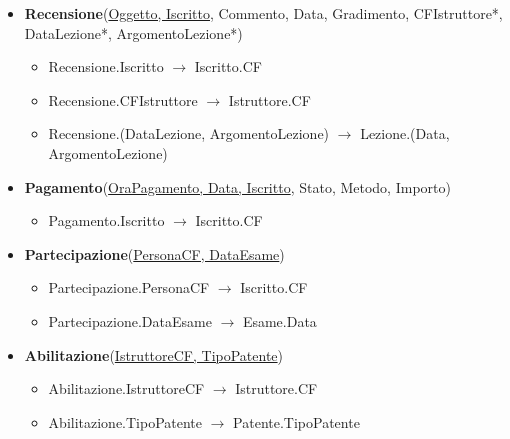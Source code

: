 \documentclass[10pt,twoside]{article}
\begin{document}
{{\begin{itemize}
            \item \textbf{Recensione}(\underline{Oggetto, Iscritto}, Commento, Data, Gradimento, CFIstruttore*, DataLezione*, ArgomentoLezione*)
            \begin{itemize}
                \item Recensione.Iscritto $\rightarrow$ Iscritto.CF
                \item Recensione.CFIstruttore $\rightarrow$ Istruttore.CF
                \item Recensione.(DataLezione, ArgomentoLezione) $\rightarrow$ Lezione.(Data, ArgomentoLezione)
            \end{itemize}
            \item \textbf{Pagamento}(\underline{OraPagamento, Data, Iscritto}, Stato, Metodo, Importo)
            \begin{itemize}
                \item Pagamento.Iscritto $\rightarrow$ Iscritto.CF
            \end{itemize}
            \item \textbf{Partecipazione}(\underline{PersonaCF, DataEsame})
            \begin{itemize}
                \item Partecipazione.PersonaCF $\rightarrow$ Iscritto.CF
                \item Partecipazione.DataEsame $\rightarrow$ Esame.Data
            \end{itemize}
            \item \textbf{Abilitazione}(\underline{IstruttoreCF, TipoPatente})
            \begin{itemize}
                \item Abilitazione.IstruttoreCF $\rightarrow$ Istruttore.CF
                \item Abilitazione.TipoPatente $\rightarrow$ Patente.TipoPatente
            \end{itemize}
        \end{itemize}
    }
}
\end{document}
